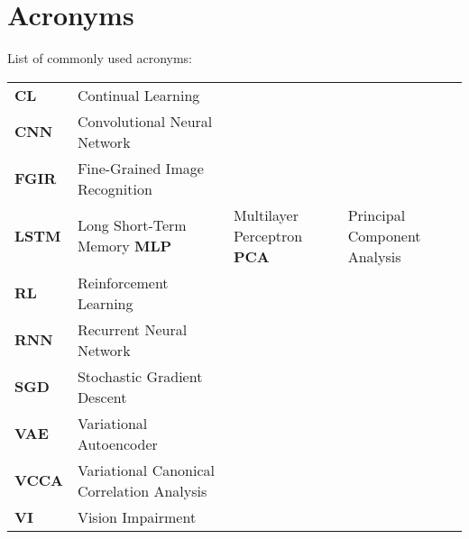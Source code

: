 
\chapter{Acronyms}
\label{chap:acronyms}

List of commonly used acronyms: \\

\begin{tabular}{llll}
	\textbf{CL}			& 	Continual Learning \\
	\textbf{CNN}		& 	Convolutional Neural Network \\
	\textbf{FGIR}		& 	Fine-Grained Image Recognition \\
	\textbf{LSTM}       &   Long Short-Term Memory
	\textbf{MLP}        &   Multilayer Perceptron
	\textbf{PCA}		& 	Principal Component Analysis \\
	\textbf{RL}			& 	Reinforcement Learning \\
	\textbf{RNN}		& 	Recurrent Neural Network \\
	\textbf{SGD}		& 	Stochastic Gradient Descent \\
	\textbf{VAE}		&	Variational Autoencoder \\
	\textbf{VCCA}		&	Variational Canonical Correlation Analysis \\
	\textbf{VI} 		&	Vision Impairment \\
\end{tabular}
